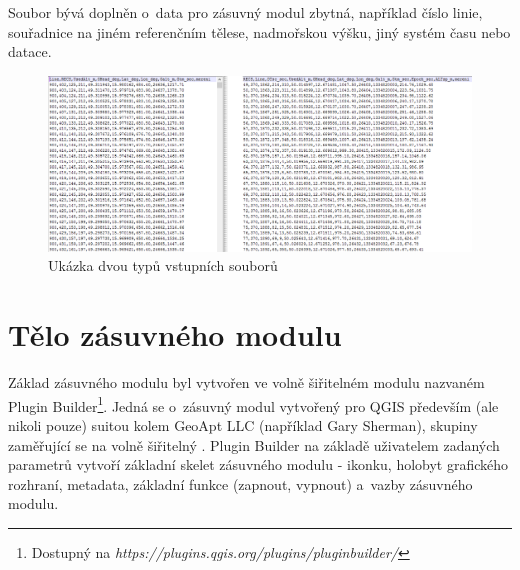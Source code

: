 Soubor bývá doplněn o~data pro zásuvný modul zbytná, například číslo linie, souřadnice na jiném
referenčním tělese, nadmořskou výšku, jiný systém času nebo datace. 

  \begin{figure}[H]
   \centering
	\includegraphics[scale=0.45]{./pictures/ukazka-vstup.png}
	\caption[Ukázka dvou typů vstupních souborů]{Ukázka dvou typů vstupních souborů
      \label{fig:ukazka-vstup}}
  \end{figure}

\section{Tělo zásuvného modulu}
\label{telo}

Základ zásuvného modulu byl vytvořen ve volně šiřitelném mo\-dulu nazvaném Plugin
Builder\footnote{Dostupný na \textit{https://plugins.qgis.org/plugins/pluginbuilder/}}. Jedná se
o~zásuvný modul vytvořený pro QGIS především (ale nikoli pouze) suitou kolem GeoApt LLC (například Gary
Sherman), skupi\-ny zaměřující se na volně šiřitelný . Plugin Builder na
základě uživatelem zadaných parametrů vytvoří základní skelet zásuvného modulu - ikonku, holobyt
grafického rozhraní, metadata, základní funkce (zapnout, vypnout) a~vazby zásuvného modulu. 

